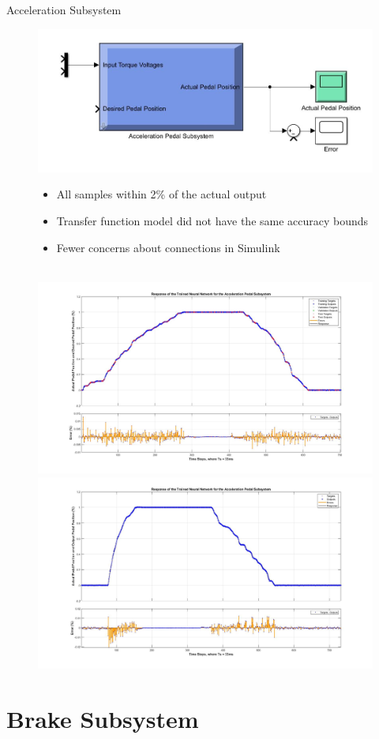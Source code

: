 \documentclass{beamer}
\begin{document}
\begin{frame}{Acceleration Subsystem}
	\begin{block}{}
  		\begin{figure}[H]
  			\centering \includegraphics[width=.45\linewidth , height=.37\textheight]{figs/img/accelerationSimulinkBlock.jpg}\quad%
			\centering \begin{minipage}[b][0.4\textheight][c]{.45\linewidth}  \begin{itemize}
			\item All samples within 2\% of the actual output
			\item Transfer function model did not have the same accuracy bounds
			\item Fewer concerns about connections in Simulink
			\end{itemize} \end{minipage}\\[1em]
			\centering \includegraphics[width=.45\linewidth , height=.37\textheight]{figs/img/accelNeuralNetworkTrainedOutput.jpg}\quad%
			\centering \includegraphics[width=.45\linewidth , height=.37\textheight]{figs/img/accelNeuralNetworkTrainedOutput2.jpg}
  		\end{figure}
	\end{block}
\end{frame}


\section{Brake Subsystem}
\end{document}

